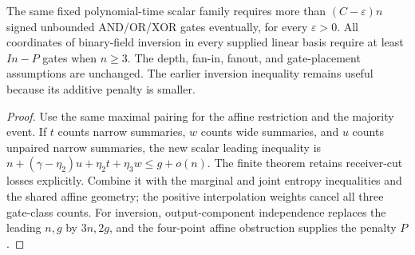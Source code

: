 \begin{theorem}
  \label{thm:lowerbounds-algebraic-geometry-conditional}
  \leanok
  The same fixed polynomial-time scalar family requires more than
  $(C-\varepsilon)n$ signed unbounded AND/OR/XOR gates eventually, for every
  $\varepsilon>0$. All coordinates of binary-field inversion in every supplied
  linear basis require at least $In-P$ gates when $n\ge3$. The depth, fan-in,
  fanout, and gate-placement assumptions are unchanged. The earlier inversion
  inequality remains useful because its additive penalty is smaller.
\end{theorem}
\begin{proof}
  \leanok
  Use the same maximal pairing for the affine restriction and the majority
  event. If $t$ counts narrow summaries, $w$ counts wide summaries, and $u$
  counts unpaired narrow summaries, the new scalar leading inequality is
  $n+(\gamma-\eta_2)u+\eta_2t+\eta_3w\le g+o(n)$.
  The finite theorem retains receiver-cut losses explicitly. Combine it with
  the marginal and joint entropy inequalities and the shared affine geometry;
  the positive interpolation weights cancel all three gate-class counts.
  For inversion, output-component independence replaces the leading $n,g$
  by $3n,2g$, and the four-point affine obstruction supplies the penalty $P$.
\end{proof}

